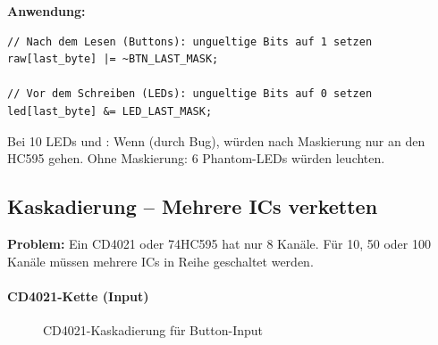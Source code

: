 \textbf{Anwendung:}

\begin{lstlisting}[style=arduino]
// Nach dem Lesen (Buttons): ungueltige Bits auf 1 setzen
raw[last_byte] |= ~BTN_LAST_MASK;

// Vor dem Schreiben (LEDs): ungueltige Bits auf 0 setzen
led[last_byte] &= LED_LAST_MASK;
\end{lstlisting}

\begin{warnbox}
Bei 10 LEDs und : Wenn  (durch Bug), würden nach Maskierung nur  an den HC595 gehen. Ohne Maskierung: 6 \glqq Phantom-LEDs\grqq{} würden leuchten.
\end{warnbox}

\subsection{Kaskadierung – Mehrere ICs verketten}

\textbf{Problem:} Ein CD4021 oder 74HC595 hat nur 8 Kanäle. Für 10, 50 oder 100 Kanäle müssen mehrere ICs in Reihe geschaltet werden.

\paragraph{CD4021-Kette (Input)}

\begin{figure}[htbp]
\centering
{}
\caption{CD4021-Kaskadierung für Button-Input}
\label{fig:cd4021-kette}
\end{figure}

